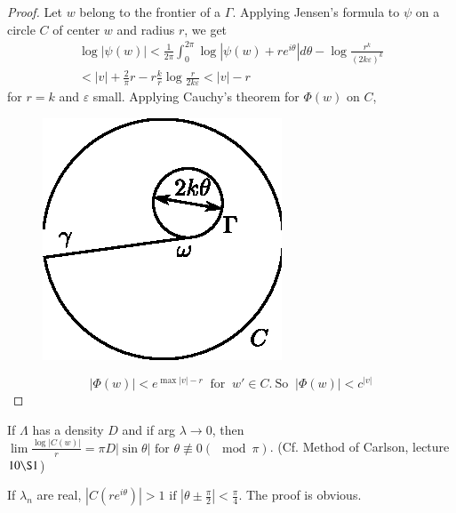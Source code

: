 \begin{proof}
 Let $w$ belong to the frontier of a $\Gamma$. Applying Jensen's
 formula to $\psi$ on a circle $C$ of center $w$ and radius $r$, we
 get 
 \begin{gather*}
 \log |\psi (w)| < \frac{1}{2 \pi} \int^{2 \pi}_0 \log |\psi (w) +
 re^{i \theta} | d \theta- \log \frac{r^k}{(2 k \varepsilon)^k}\\ 
 < |v| + \frac{2}{\pi}r - r \frac{k}{r} \log \frac{r}{ 2 k
  \varepsilon} < |v| -r 
 \end{gather*}
 for $r = k$ and $\varepsilon$ small. Applying Cauchy's theorem for
 $\Phi (w)$ on $C$, 
 \begin{figure}[H]
 \centerline{\includegraphics{vol15-figures/fig15-12.eps}}
 \end{figure}
 $$
 |\Phi (w)| < e^{\max |v| -r} ~\text{ for }~ w' \in C. ~\text{
 So }~ |\Phi (w)| < c^{|v|} 
 $$ 
\end{proof}

\begin{lem}\label{chap14:lem7}
 If $\Lambda$ has a density $D$ and if arg $\lambda \to 0$, then
 $\lim \frac{\log |C(w)|} {r} = \pi D |\sin \theta| \text{ for }
 \theta \nequiv 0 (\mod \pi) $. (Cf. Method of Carlson, lecture $10 \S 1$) 
\end{lem}

\begin{lem}\label{chap14:lem8}
  If $\lambda_n$ are real, $|C (re^{i \theta})| > 1 \text{ if }
  |\theta \pm \frac{\pi}{2}| < \frac{\pi}{4}$. The proof is obvious. 
\end{lem}
